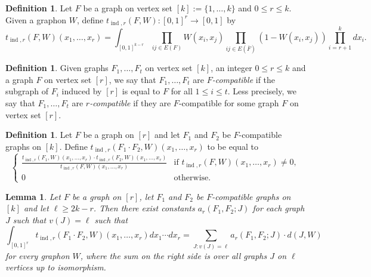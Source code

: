\documentclass[12pt]{article}
\numberwithin{equation}{section}
\newtheorem{lem}[equation]{Lemma}
\theoremstyle{definition}
\newtheorem{defn}[equation]{Definition}
\theoremstyle{remark}
\DeclareMathOperator{\ind}{ind}
\begin{document}
\begin{defn}
Let $F$ be a graph on vertex set $[k]:=\{1,\dots,k\}$ and $0\leq r\leq k$. Given a graphon $W$, define $t_{\ind,r}(F,W):[0,1]^{r}\to [0,1]$ by
\[t_{\ind,r}(F,W)(x_1,\dots,x_r)=\int_{[0,1]^{k-r}}\prod_{ij\in E(F)}W(x_i,x_j)\prod_{ij\in E(\overline{F})}(1-W(x_i,x_j))\prod_{i=r+1}^kdx_i.\]
\end{defn}

\begin{defn}
Given graphs $F_1,\dots,F_t$ on vertex set $[k]$, an integer $0\leq r\leq k$ and a graph $F$ on vertex set $[r]$, we say that $F_1,\dots,F_t$ are \emph{$F$-compatible} if the subgraph of $F_i$ induced by $[r]$ is equal to $F$ for all $1\leq i\leq t$. Less precisely, we say that $F_1,\dots,F_t$ are \emph{$r$-compatible} if they are $F$-compatible for some graph $F$ on vertex set $[r]$.
\end{defn}

\begin{defn}
Let $F$ be a graph on $[r]$ and let $F_1$ and $F_2$ be $F$-compatible graphs on $[k]$. Define $t_{\ind,r}(F_1\cdot F_2,W)(x_{1},\dots,x_r)$ to be equal to
\[\begin{cases}\displaystyle\frac{t_{\ind,r}(F_1,W)(x_{1},\dots,x_r)\cdot t_{\ind,r}(F_2,W)(x_{1},\dots,x_r)}{t_{\ind,r}(F,W)(x_1,\dots,x_r)} &\text{if } t_{\ind,r}(F,W)(x_1,\dots,x_r)\neq 0,\\ \displaystyle0 &\text{otherwise}.\end{cases}\]
\end{defn}

\begin{lem}
\label{lem:integrateOut}
Let $F$ be a graph on $[r]$, let $F_1$ and $F_2$ be $F$-compatible graphs on $[k]$ and let $\ell\geq2k-r$. Then there exist constants $a_r(F_1,F_2;J)$ for each graph $J$ such that $v(J)=\ell$ such that
\[\int_{[0,1]^r}t_{\ind,r}(F_1\cdot F_2,W)(x_1,\dots,x_r)dx_1\cdots dx_r=\sum_{J:v(J)=\ell}a_r(F_1,F_2;J)\cdot d(J,W)\]
for every graphon $W$, where the sum on the right side is over all graphs $J$ on $\ell$ vertices up to isomorphism. 
\end{lem}
\end{document}
